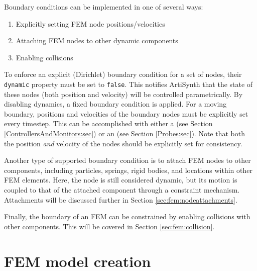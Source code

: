 Boundary conditions can be implemented in one of several ways:
\begin{enumerate}
	\item Explicitly setting FEM node positions/velocities
	\item Attaching FEM nodes to other dynamic components
	\item Enabling collisions
\end{enumerate}
To enforce an explicit (Dirichlet) boundary condition for a set of  
nodes, their {\tt dynamic} property must be set to {\tt false}.  This notifies
ArtiSynth that the state of these nodes (both position and velocity) will 
be controlled parametrically.  By disabling dynamics, a fixed 
boundary condition is applied.  For a moving boundary, positions and velocities 
of the boundary nodes must be explicitly set every timestep.  This can be 
accomplished with either a  
(see Section \ref{ControllersAndMonitors:sec}) or an 
 (see Section \ref{Probes:sec}).
Note that both the position \emph{and} velocity of the nodes should be
explicitly set for consistency.

Another type of supported boundary condition is to attach FEM nodes to other
components, including particles, springs, rigid bodies, and locations within
other FEM elements.  Here, the node is still considered dynamic, but its
motion is coupled to that of the attached component through a constraint
mechanism. Attachments will be discussed further in Section 
\ref{sec:fem:nodeattachments}.

Finally, the boundary of an FEM can be constrained by enabling collisions
with other components.  This will be covered in Section
\ref{sec:fem:collision}.


\section{FEM model creation}

